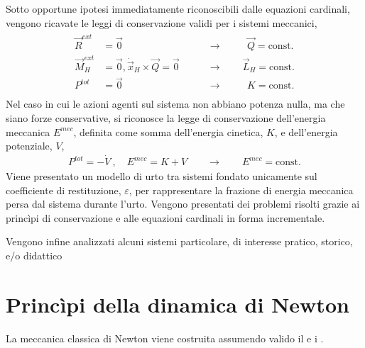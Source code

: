 \documentclass[letterpaper,10pt,italian]{jupyterBook}
\begin{document}
\sphinxAtStartPar
{} Sotto opportune ipotesi immediatamente riconoscibili dalle equazioni cardinali, vengono ricavate le leggi di conservazione validi per i sistemi meccanici,
\begin{equation*}
\begin{split}\begin{aligned}
  \vec{R}^{ext} & = \vec{0} \qquad  & \rightarrow \qquad \ \ \vec{Q} = \text{const.} \\
  \vec{M}_H^{ext} & = \vec{0}, \dot{\vec{x}}_H \times \vec{Q} = \vec{0} \qquad  & \rightarrow \qquad \vec{L}_H = \text{const.} \\
  P^{tot} & = \vec{0} \qquad  & \rightarrow \qquad \ \  K = \text{const.} \\
\end{aligned}\end{split}
\end{equation*}
\sphinxAtStartPar
Nel caso in cui le azioni agenti sul sistema non abbiano potenza nulla, ma che siano forze conservative, si riconosce la legge di conservazione dell’energia meccanica \(E^{mec}\), definita come somma dell’energia cinetica, \(K\), e dell’energia potenziale, \(V\),
\begin{equation*}
\begin{split}P^{tot} = -\dot{V} \ , \quad E^{mec} = K + V \qquad \rightarrow \qquad E^{mec} = \text{const.}\end{split}
\end{equation*}
\sphinxAtStartPar
{}
Viene presentato un modello di urto tra sistemi fondato unicamente sul coefficiente di restituzione, \(\varepsilon\), per rappresentare la frazione di energia meccanica persa dal sistema durante l’urto. Vengono presentati dei problemi risolti grazie ai princìpi di conservazione e alle equazioni cardinali in forma incrementale.

\sphinxAtStartPar
{} Vengono infine analizzati alcuni sistemi particolare, di interesse pratico, storico, e/o didattico 



\sphinxstepscope


\section{Princìpi della dinamica di Newton}
\label{\detokenize{ch/mechanics/dynamics-principles:principi-della-dinamica-di-newton}}\label{\detokenize{ch/mechanics/dynamics-principles:physics-hs-mechanics-dynamics-principles}}\label{\detokenize{ch/mechanics/dynamics-principles::doc}}
\sphinxAtStartPar
La meccanica classica di Newton viene costruita assumendo valido il  e i .
\end{document}
